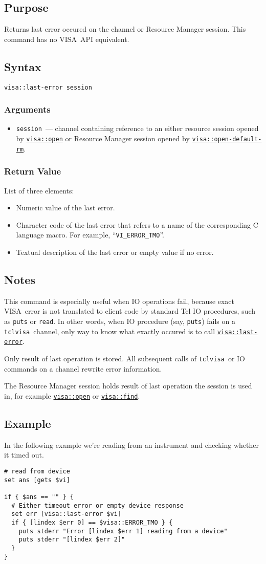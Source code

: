 \documentclass[12pt, a4paper]{report}
\newcommand{\tclvisa}{{\tt tclvisa }}
\newcommand{\VISA}{\mbox{VISA }}
\newcommand{\COMMANDREF}[1]{{\tt \hyperref[#1]{#1}}}
\newcommand{\TCLCOMMANDREF}[1]{{\tt \mbox{#1}}\index{#1}}
\newcommand{\EXAMPLE}{\subsection*{Example}}
\newcommand{\PURPOSE}{\subsection*{Purpose}}
\newcommand{\SYNTAX}[1]{\subsection*{Syntax}{\tt #1}}
\newcommand{\NOTES}{\subsection*{Notes}}
\newcommand{\ARGUMENTS}{\subsubsection*{Arguments}}
\newcommand{\RETURN}{\subsubsection*{Return Value}}
\newcommand{\BEGINARGUMENTS}{\ARGUMENTS\begin{itemize}}
\newcommand{\ENDARGUMENTS}{\end{itemize}}
\newcommand{\ARGUMENT}[1]{\item {\tt \mbox{#1}}~---}
\begin{document}
\PURPOSE

Returns last error occured on the channel or Resource Manager session. This command has no \VISA API equivalent.

\SYNTAX{visa::last-error session}

\BEGINARGUMENTS
\ARGUMENT{session} channel containing reference to an either resource session opened by \COMMANDREF{visa::open} or Resource Manager session opened by \COMMANDREF{visa::open-default-rm}.
\ENDARGUMENTS

\RETURN

List of three elements:

\begin{itemize}
\item Numeric value of the last error.
\item Character code of the last error that refers to a name of the corresponding C language macro. For example, ``{\tt VI\_ERROR\_TMO}''.
\item Textual description of the last error or empty value if no error.
\end{itemize}

\NOTES

This command is especially useful when IO operations fail, because exact \VISA error is not translated to client code by standard Tcl IO procedures, such as \TCLCOMMANDREF{puts} or \TCLCOMMANDREF{read}. In other words, when IO procedure (say, \TCLCOMMANDREF{puts}) fails on a \tclvisa channel, only way to know what exactly occured is to call \COMMANDREF{visa::last-error}.

Only result of last operation is stored. All subsequent calls of \tclvisa or IO commands on a channel rewrite error information.

The Resource Manager session holds result of last operation the session is used in, for example \COMMANDREF{visa::open} or \COMMANDREF{visa::find}.

\EXAMPLE

In the following example we're reading from an instrument and checking whether it timed out.

\begin{verbatim} 
# read from device
set ans [gets $vi]

if { $ans == "" } {
  # Either timeout error or empty device response
  set err [visa::last-error $vi]
  if { [lindex $err 0] == $visa::ERROR_TMO } {
    puts stderr "Error [lindex $err 1] reading from a device"
    puts stderr "[lindex $err 2]"
  }
}
\end{verbatim} 
\end{document}
